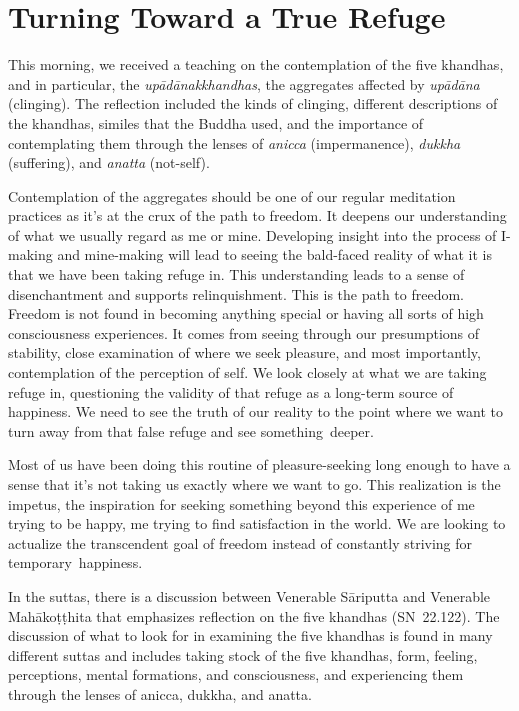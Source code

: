 
\chapter{Turning Toward a True Refuge}

\enlargethispage{-1\baselineskip}
This morning, we received a teaching on the contemplation of the five khandhas, and in particular, the \emph{upādānakkhandhas}, the aggregates affected by \emph{upādāna} (clinging). The reflection included the kinds of clinging, different descriptions of the khandhas, similes that the Buddha used, and the importance of contemplating them through the lenses of \emph{anicca} (impermanence), \emph{dukkha} (suffering), and \emph{anatta} (not-self).

Contemplation of the aggregates should be one of our regular meditation practices as it's at the crux of the path to freedom. It deepens our understanding of what we usually regard as me or mine. Developing insight into the process of I-making and mine-making will lead to seeing the bald-faced reality of what it is that we have been taking refuge in. This understanding leads to a sense of disenchantment and supports relinquishment. This is the path to freedom. Freedom is not found in becoming anything special or having all sorts of high consciousness experiences. It comes from seeing through our presumptions of stability, close \mbox{examination} of where we seek pleasure, and most importantly, \mbox{contemplation} of the perception of self. We look closely at what we are taking refuge in, questioning the validity of that refuge as a long-term source of happiness. We need to see the truth of our reality to the point where we want to turn away from that false refuge and see \mbox{something deeper.}

Most of us have been doing this routine of pleasure-seeking long enough to have a sense that it's not taking us exactly where we want to go. This realization is the impetus, the inspiration for seeking something beyond this experience of me trying to be happy, me trying to find satisfaction in the world. We are looking to actualize the transcendent goal of freedom instead of constantly striving for \mbox{temporary happiness.}

In the suttas, there is a discussion between Venerable Sāriputta and Venerable Mahākoṭṭhita that emphasizes reflection on the five khandhas \mbox{(SN 22.122)}. The discussion of what to look for in examining the five khandhas is found in many different suttas and includes taking stock of the five khandhas, form, feeling, perceptions, mental formations, and consciousness, and experiencing them through the lenses of anicca, dukkha, and anatta.

